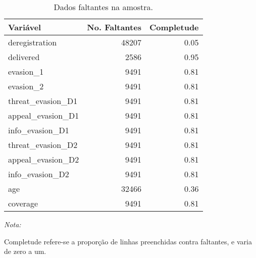 \begin{table}[H]

\caption{\label{tab:missings}Dados faltantes na amostra.}
\centering
\begin{threeparttable}
\begin{tabular}[t]{lrr}
\toprule
Variável & No. Faltantes & Completude\\
\midrule
deregistration & 48207 & 0.05\\
delivered & 2586 & 0.95\\
evasion\_1 & 9491 & 0.81\\
evasion\_2 & 9491 & 0.81\\
threat\_evasion\_D1 & 9491 & 0.81\\
\addlinespace
appeal\_evasion\_D1 & 9491 & 0.81\\
info\_evasion\_D1 & 9491 & 0.81\\
threat\_evasion\_D2 & 9491 & 0.81\\
appeal\_evasion\_D2 & 9491 & 0.81\\
info\_evasion\_D2 & 9491 & 0.81\\
\addlinespace
age & 32466 & 0.36\\
coverage & 9491 & 0.81\\
\bottomrule
\end{tabular}
\begin{tablenotes}
\item \textit{Nota:} 
\item Completude refere-se a proporção de linhas preenchidas contra faltantes, e varia de zero a um.
\end{tablenotes}
\end{threeparttable}
\end{table}
